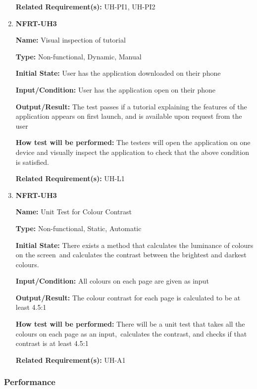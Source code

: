 \documentclass[12pt, titlepage]{article}
\begin{document}
\begin{enumerate}
\textbf{Related Requirement(s):} UH-PI1, UH-PI2

\item{\textbf{NFRT-UH3}}

\textbf{Name:} Visual inspection of tutorial

\textbf{Type:} Non-functional, Dynamic, Manual
					
\textbf{Initial State:} User has the application downloaded on their phone
					
\textbf{Input/Condition:} User has the application open on their phone
					
\textbf{Output/Result:} The test passes if a tutorial explaining the features of the application appears on first launch, and is available upon request from the user

\textbf{How test will be performed:} The testers will open the application on one device and visually inspect the application to check that the above condition is satisfied.

\textbf{Related Requirement(s):} UH-L1

\item{\textbf{NFRT-UH3}}

\textbf{Name:} Unit Test for Colour Contrast

\textbf{Type:} Non-functional, Static, Automatic
					
\textbf{Initial State:} There exists a method that calculates the luminance of colours on the screen\
and calculates the contrast between the brightest and darkest colours.

\textbf{Input/Condition:} All colours on each page are given as input

\textbf{Output/Result:} The colour contrast for each page is calculated to be at least 4.5:1

\textbf{How test will be performed:} There will be a unit test that takes all the colours on each page as an input,\
calculates the contrast, and checks if that contrast is at least 4.5:1

\textbf{Related Requirement(s):} UH-A1

\end{enumerate}

\subsubsection{Performance}
\end{document}
